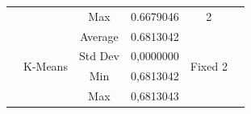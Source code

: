 \documentclass[journal]{IEEEtran}
\begin{document}
\begin{table}[]
\begin{tabular}{|c|c|c|c|c|c|}
		&                          & Max                 & 0.6679046        & 2                        &                       \\ \cline{2-5}
		& \multirow{4}{*}{K-Means} & Average             & 0.6813042        & \multirow{4}{*}{Fixed 2} &                       \\ \cline{3-4}
		&                          & Std Dev             & 0,0000000        &                          &                       \\ \cline{3-4}
		&                          & Min                 & 0,6813042        &                          &                       \\ \cline{3-4}
		&                          & Max                 & 0,6813043        &                          &                       \\ \hline
	\end{tabular}
\end{table}
\end{document}
